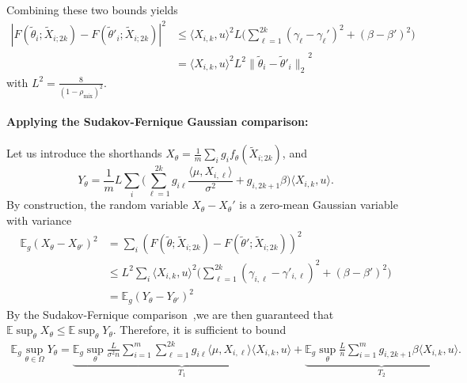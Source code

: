 \documentclass[twoside,11pt]{article}
\def\EE{ \mathbb{E} }
\newcommand{\norm}[1]{\ensuremath{\|#1\|_2}}
\newcommand{\mixcoef}{\ensuremath{\rho_{\mathrm{mix}}}}
\newcommand{\paramobs}{\mu}
\newcommand{\paramtrans}{\beta}
\newcommand{\paramjoint}{\theta}
\newcommand{\paramspacejoint}{\DomTheta}
\newcommand{\paramgamma}{\gamma}
\newcommand{\DomTheta}{\ensuremath{\Omega}}
\newcommand{\Xtil}{\ensuremath{\widetilde{X}}}
\newcommand{\funcproc}{f_{\paramjoint}}
\newcommand{\funcprocgamma}[1]{F(#1;\blockXi)}
\newcommand{\blockXi}{\Xtil_{i;2k}}
\newcommand{\lipcont}{\ensuremath{L}}
\newcommand{\paramjointgamma}{\tilde{\paramjoint}}
\begin{document}
Combining these two bounds yields
\begin{align*}
|\funcprocgamma{\paramjointgamma_i} -
\funcprocgamma{\paramjointgamma'_i}|^2 &\leq \langle X_{i,k},u
\rangle^2 \lipcont \big(\sum_{\ell=1}^{2k} (\paramgamma_\ell -
\paramgamma_\ell')^2 + (\paramtrans-\paramtrans')^2\big) \\
&= \langle
X_{i,k},u\rangle^2 \lipcont^2 \norm{\paramjointgamma_i -
  \paramjointgamma'_i}^2
\end{align*}
with $ \lipcont^2 = \frac{8}{(1-\mixcoef)^2}$.


\paragraph{Applying the Sudakov-Fernique Gaussian comparison:} 

Let us introduce the shorthands \mbox{$X_\paramjoint = \frac{1}{m}
  \sum_i g_i \funcproc(\blockXi)$,} and
\begin{equation*}
Y_{\paramjoint} = \frac{1}{m} \lipcont \sum_i \big(\sum_{\ell=1}^{2k}
g_{i \ell} \frac{\langle \paramobs, X_{i,\ell} \rangle}{\sigma^2} +
g_{i,2k+1} \paramtrans \big) \langle X_{i,k}, u\rangle.
\end{equation*}
By construction, the random variable $X_\paramjoint - X_\paramjoint'$
is a zero-mean Gaussian variable with variance
\begin{align}
\EE_g (X_{\paramjoint}-X_{\paramjoint'})^2 &= \sum_i
(\funcprocgamma{\paramjointgamma} -
\funcprocgamma{\paramjointgamma'})^2 \nonumber\\ &\leq \lipcont^2
\sum_i \langle X_{i,k},u\rangle^2 \big( \sum_{\ell=1}^{2k}
(\paramgamma_{i,\ell} - \paramgamma'_{i,\ell})^2 +
(\paramtrans-\paramtrans')^2 \big) \nonumber\\ &= \EE_g
(Y_{\paramjoint} - Y_{\paramjoint'})^2
\end{align}
%
By the Sudakov-Fernique comparison~\cite{LedTalBanach},we are then
guaranteed that $\EE \sup_{\paramjoint} X_{\paramjoint} \leq \EE
\sup_{\paramjoint} Y_{\paramjoint}$.  Therefore, it is sufficient to
bound
\begin{align*}
\EE_g\sup_{\paramjoint\in\paramspacejoint} Y_{\paramjoint}=
\underbrace{\EE_g \sup_{\paramjoint} \frac{\lipcont}{\sigma^2 n}
  \sum_{i=1}^m \sum_{\ell=1}^{2k} g_{i \ell} \langle \paramobs,
  X_{i,\ell} \rangle\langle X_{i,k}, u\rangle}_{T_1} +
\underbrace{\EE_g \sup_{\paramjoint} \frac{\lipcont}{n}\sum_{i=1}^m
  g_{i,2k+1} \paramtrans \langle X_{i,k}, u\rangle}_{T_2}.
\end{align*}
\end{document}
